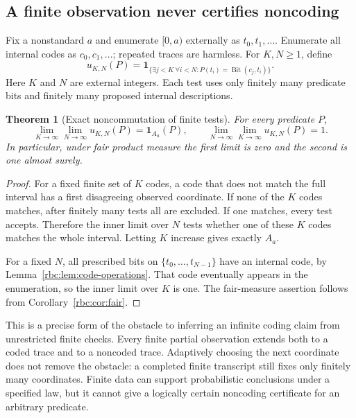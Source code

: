 \documentclass[11pt]{article}
\numberwithin{equation}{section}
\newtheorem{theorem}{Theorem}[section]
\theoremstyle{definition}
\theoremstyle{remark}
\newcommand{\Bit}{\operatorname{Bit}}
\newcommand{\ind}{\mathbf 1}
\begin{document}
\subsection{A finite observation never certifies noncoding}

Fix a nonstandard $a$ and enumerate $[0,a)$ externally as
$t_0,t_1,\ldots$. Enumerate all internal codes as $c_0,c_1,\ldots$;
repeated traces are harmless. For $K,N\ge1$, define
\begin{equation}
 u_{K,N}(P)=\ind_{\{\exists j<K\ \forall i<N:
                          P(t_i)=\Bit(c_j,t_i)\}}.
\label{rbc:eq:finite-test}
\end{equation}
Here $K$ and $N$ are external integers. Each test uses only finitely many
predicate bits and finitely many proposed internal descriptions.

\begin{theorem}[Exact noncommutation of finite tests]
\label{rbc:thm:double-limit}
For every predicate $P$,
\begin{equation}
 \lim_{K\to\infty}\lim_{N\to\infty}u_{K,N}(P)=\ind_{A_a}(P),
 \qquad
 \lim_{N\to\infty}\lim_{K\to\infty}u_{K,N}(P)=1.
\label{rbc:eq:double-limit}
\end{equation}
In particular, under fair product measure the first limit is zero and the
second is one almost surely.
\end{theorem}

\begin{proof}
For a fixed finite set of $K$ codes, a code that does not match the full
interval has a first disagreeing observed coordinate. If none of the $K$
codes matches, after finitely many tests all are excluded. If one matches,
every test accepts. Therefore the inner limit over $N$ tests whether one
of these $K$ codes matches the whole interval. Letting $K$ increase gives
exactly $A_a$.

For a fixed $N$, all prescribed bits on $\{t_0,\ldots,t_{N-1}\}$ have an
internal code, by Lemma~\ref{rbc:lem:code-operations}. That code eventually
appears in the enumeration, so the inner limit over $K$ is one. The
fair-measure assertion follows from Corollary~\ref{rbc:cor:fair}.
\end{proof}

This is a precise form of the obstacle to inferring an infinite coding
claim from unrestricted finite checks. Every finite partial observation
extends both to a coded trace and to a noncoded trace. Adaptively choosing
the next coordinate does not remove the obstacle: a completed finite
transcript still fixes only finitely many coordinates. Finite data can
support probabilistic conclusions under a specified law, but it cannot
give a logically certain noncoding certificate for an arbitrary predicate.
\end{document}
